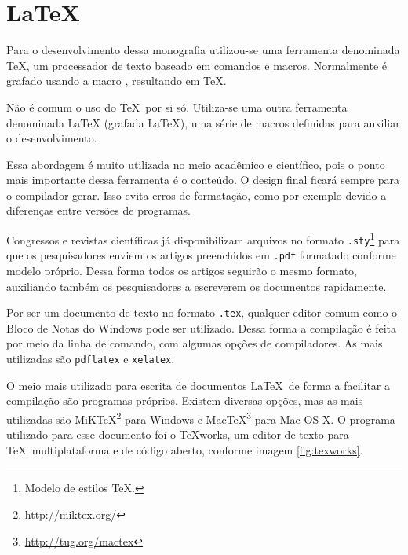 
\chapter{LaTeX}\label{ap:latex}

Para o desenvolvimento dessa monografia utilizou-se uma ferramenta denominada TeX, um processador de texto baseado em comandos e macros. Normalmente é grafado usando a macro \texttt{\detokenize{\TeX}}, resultando em \TeX. 

Não é comum o uso do \TeX\ por si só. Utiliza-se uma outra ferramenta denominada LaTeX (grafada \LaTeX), uma série de macros definidas para auxiliar o desenvolvimento.

Essa abordagem é muito utilizada no meio acadêmico e científico, pois o ponto mais importante dessa ferramenta é o conteúdo. O design final ficará sempre para o compilador gerar. Isso evita erros de formatação, como por exemplo devido a diferenças entre versões de programas.

Congressos e revistas científicas já disponibilizam arquivos no formato \texttt{.sty}\footnote{Modelo de estilos \TeX.} para que os pesquisadores enviem os artigos preenchidos em \texttt{.pdf} formatado conforme modelo próprio. Dessa forma todos os artigos seguirão o mesmo formato, auxiliando também os pesquisadores a escreverem os documentos rapidamente.

Por ser um documento de texto no formato \texttt{.tex}, qualquer editor comum como o Bloco de Notas do Windows pode ser utilizado. Dessa forma a compilação é feita por meio da linha de comando, com algumas opções de compiladores. As mais utilizadas são \texttt{pdflatex} e \texttt{xelatex}.

O meio mais utilizado para escrita de documentos \LaTeX\ de forma a facilitar a compilação são programas próprios. Existem diversas opções, mas as mais utilizadas são MiKTeX\footnote{\url{http://miktex.org/}} para Windows e MacTeX\footnote{\url{http://tug.org/mactex}} para Mac OS X. O programa utilizado para esse documento foi o TeXworks, um editor de texto para \TeX\ multiplataforma e de código aberto, conforme imagem \ref{fig:texworks}.

